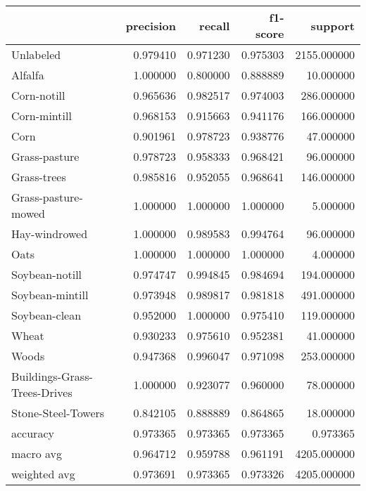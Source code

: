 \begin{tabular}{lrrrr}
\toprule
{} &  precision &    recall &  f1-score &      support \\
\midrule
Unlabeled                    &   0.979410 &  0.971230 &  0.975303 &  2155.000000 \\
Alfalfa                      &   1.000000 &  0.800000 &  0.888889 &    10.000000 \\
Corn-notill                  &   0.965636 &  0.982517 &  0.974003 &   286.000000 \\
Corn-mintill                 &   0.968153 &  0.915663 &  0.941176 &   166.000000 \\
Corn                         &   0.901961 &  0.978723 &  0.938776 &    47.000000 \\
Grass-pasture                &   0.978723 &  0.958333 &  0.968421 &    96.000000 \\
Grass-trees                  &   0.985816 &  0.952055 &  0.968641 &   146.000000 \\
Grass-pasture-mowed          &   1.000000 &  1.000000 &  1.000000 &     5.000000 \\
Hay-windrowed                &   1.000000 &  0.989583 &  0.994764 &    96.000000 \\
Oats                         &   1.000000 &  1.000000 &  1.000000 &     4.000000 \\
Soybean-notill               &   0.974747 &  0.994845 &  0.984694 &   194.000000 \\
Soybean-mintill              &   0.973948 &  0.989817 &  0.981818 &   491.000000 \\
Soybean-clean                &   0.952000 &  1.000000 &  0.975410 &   119.000000 \\
Wheat                        &   0.930233 &  0.975610 &  0.952381 &    41.000000 \\
Woods                        &   0.947368 &  0.996047 &  0.971098 &   253.000000 \\
Buildings-Grass-Trees-Drives &   1.000000 &  0.923077 &  0.960000 &    78.000000 \\
Stone-Steel-Towers           &   0.842105 &  0.888889 &  0.864865 &    18.000000 \\
accuracy                     &   0.973365 &  0.973365 &  0.973365 &     0.973365 \\
macro avg                    &   0.964712 &  0.959788 &  0.961191 &  4205.000000 \\
weighted avg                 &   0.973691 &  0.973365 &  0.973326 &  4205.000000 \\
\bottomrule
\end{tabular}
